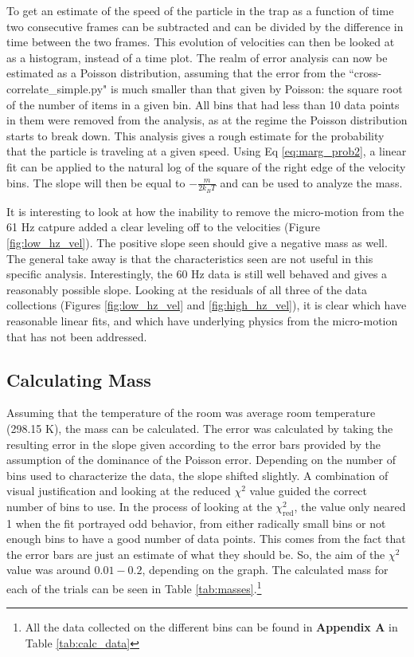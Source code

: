 \documentclass[12pt]{article}
\begin{document}
To get an estimate of the speed of the particle in the trap as a function of time two consecutive frames can be subtracted and can be divided by the difference in time between the two frames. This evolution of velocities can then be looked at as a histogram, instead of a time plot. The realm of error analysis can now be estimated as a Poisson distribution, assuming that the error from the ``cross-correlate\_simple.py" is much smaller than that given by Poisson: the square root of the number of items in a given bin. All bins that had less than 10 data points in them were removed from the analysis, as at the regime the Poisson distribution starts to break down. This analysis gives a rough estimate for the probability that the particle is traveling at a given speed. Using Eq \ref{eq:marg_prob2}, a linear fit can be applied to the natural log of the square of the right edge of the velocity bins. The slope will then be equal to $-\frac{m}{2 k_B T}$ and can be used to analyze the mass. 

It is interesting to look at how the inability to remove the micro-motion from the 61 Hz catpure added a clear leveling off to the velocities (Figure \ref{fig:low_hz_vel}). The positive slope seen should give a negative mass as well. The general take away is that the characteristics seen are not useful in this specific analysis. Interestingly, the 60 Hz data is still well behaved and gives a reasonably possible slope. Looking at the residuals of all three of the data collections (Figures  \ref{fig:low_hz_vel} and \ref{fig:high_hz_vel}), it is clear which have reasonable linear fits, and which have underlying physics from the micro-motion that has not been addressed. 


\subsection{Calculating Mass}

Assuming that the temperature of the room was average room temperature (298.15 K), the mass can be calculated. The error was calculated by taking the resulting error in the slope given according to the error bars provided by the assumption of the dominance of the Poisson error. Depending on the number of bins used to characterize the data, the slope shifted slightly. A combination of visual justification and looking at the reduced $\chi^2$ value guided the correct number of bins to use. In the process of looking at the $\chi_\text{red}^2$, the value only neared 1 when the fit portrayed odd behavior, from either radically small bins or not enough bins to have a good number of data points. This comes from the fact that the error bars are just an estimate of what they should be. So, the aim of the $\chi^2$ value was around $0.01-0.2$, depending on the graph. The calculated mass for each of the trials can be seen in Table \ref{tab:masses}.\footnote{All the data collected on the different bins can be found in \textbf{Appendix A} in Table \ref{tab:calc_data}}
\end{document}
